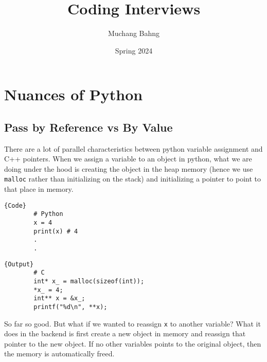 \documentclass{article}
\begin{document}
\title{Coding Interviews}
\author{Muchang Bahng}
\date{Spring 2024}

\maketitle
\tableofcontents
\pagebreak

\section{Nuances of Python}

  \subsection{Pass by Reference vs By Value}

    There are a lot of parallel characteristics between python variable assignment and C++ pointers. When we assign a variable to an object in python, what we are doing under the hood is creating the object in the heap memory (hence we use \texttt{malloc} rather than initializing on the stack) and initializing a pointer to point to that place in memory. 

    \noindent\begin{minipage}{.5\textwidth}
      \begin{lstlisting}[]{Code}
        # Python 
        x = 4
        print(x) # 4
        .
        .
      \end{lstlisting}
      \end{minipage}
      \hfill
      \begin{minipage}{.49\textwidth}
      \begin{lstlisting}[]{Output}
        # C  
        int* x_ = malloc(sizeof(int)); 
        *x_ = 4; 
        int** x = &x_; 
        printf("%d\n", **x); 
      \end{lstlisting}
    \end{minipage}

    So far so good. But what if we wanted to reassign \texttt{x} to another variable? What it does in the backend is first create a new object in memory and reassign that pointer to the new object. If no other variables points to the original object, then the memory is automatically freed.  
\end{document}
